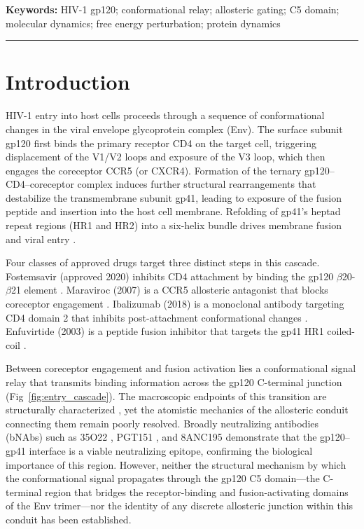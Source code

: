 \documentclass[11pt,a4paper]{article}
\begin{document}
\vspace{0.5em}
\noindent\textbf{Keywords:} HIV-1 gp120; conformational relay; allosteric gating; C5 domain; molecular dynamics; free energy perturbation; protein dynamics

\vspace{1em}
\rule{\textwidth}{0.4pt}
\vspace{0.5em}

\section{Introduction}

HIV-1 entry into host cells proceeds through a sequence of conformational changes in the viral envelope glycoprotein complex (Env). The surface subunit gp120 first binds the primary receptor CD4 on the target cell, triggering displacement of the V1/V2 loops and exposure of the V3 loop, which then engages the coreceptor CCR5 (or CXCR4). Formation of the ternary gp120--CD4--coreceptor complex induces further structural rearrangements that destabilize the transmembrane subunit gp41, leading to exposure of the fusion peptide and insertion into the host cell membrane. Refolding of gp41's heptad repeat regions (HR1 and HR2) into a six-helix bundle drives membrane fusion and viral entry \citep{Chan1997,Weissenhorn1997}.

Four classes of approved drugs target three distinct steps in this cascade. Fostemsavir (approved 2020) inhibits CD4 attachment by binding the gp120 $\beta$20-$\beta$21 element \citep{Pancera2017}. Maraviroc (2007) is a CCR5 allosteric antagonist that blocks coreceptor engagement \citep{Dorr2005}. Ibalizumab (2018) is a monoclonal antibody targeting CD4 domain 2 that inhibits post-attachment conformational changes \citep{Jacobson2009}. Enfuvirtide (2003) is a peptide fusion inhibitor that targets the gp41 HR1 coiled-coil \citep{Wild1994,Kilby1998}.

Between coreceptor engagement and fusion activation lies a conformational signal relay that transmits binding information across the gp120 C-terminal junction (Fig~\ref{fig:entry_cascade}). The macroscopic endpoints of this transition are structurally characterized \citep{Pancera2010,Julien2013,Shaik2019}, yet the atomistic mechanics of the allosteric conduit connecting them remain poorly resolved. Broadly neutralizing antibodies (bNAbs) such as 35O22 \citep{Huang2014}, PGT151 \citep{Blattner2014,Lee2016}, and 8ANC195 \citep{Scharf2014} demonstrate that the gp120--gp41 interface is a viable neutralizing epitope, confirming the biological importance of this region. However, neither the structural mechanism by which the conformational signal propagates through the gp120 C5 domain---the C-terminal region that bridges the receptor-binding and fusion-activating domains of the Env trimer---nor the identity of any discrete allosteric junction within this conduit has been established.
\end{document}
